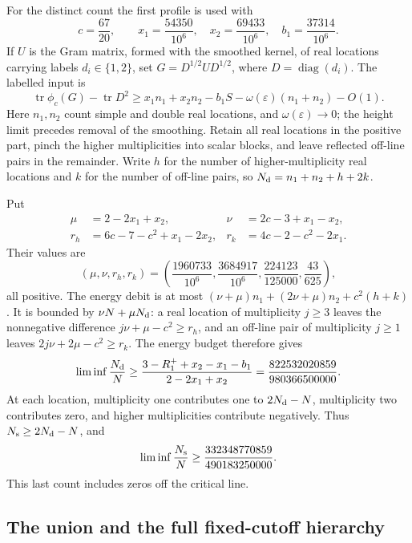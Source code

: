 \documentclass[11pt,reqno]{amsart}
\numberwithin{equation}{section}
\begin{document}
For the distinct count the first profile is used with
\[
 c=\frac{67}{20},\qquad
 x_1=\frac{54350}{10^6},\quad
 x_2=\frac{69433}{10^6},\quad b_1=\frac{37314}{10^6}.
\]
If $U$ is the Gram matrix, formed with the smoothed kernel, of real
locations carrying labels $d_i\in\{1,2\}$, set $G=D^{1/2}UD^{1/2}$, where
$D=\operatorname{diag}(d_i)$. The labelled input is
\[
 \operatorname{tr}\phi_c(G)-\operatorname{tr}D^2
 \ge x_1n_1+x_2n_2-b_1S-\omega(\varepsilon)(n_1+n_2)-O(1).
\]
Here $n_1,n_2$ count simple and double real locations, and
$\omega(\varepsilon)\to0$; the height limit precedes removal of the
smoothing. Retain all real locations in the positive part, pinch the
higher multiplicities into scalar blocks, and leave reflected off-line
pairs in the remainder.
Write $h$ for the number of higher-multiplicity real locations and
$k$ for the number of off-line pairs, so
$N_{\rm d}=n_1+n_2+h+2k$.

Put
\[
 \begin{aligned}
 \mu&=2-2x_1+x_2,&\nu&=2c-3+x_1-x_2,\\
 r_h&=6c-7-c^2+x_1-2x_2,&
 r_k&=4c-2-c^2-2x_1.
 \end{aligned}
\]
Their values are
\[
 (\mu,\nu,r_h,r_k)=
 \left(\frac{1960733}{10^6},\frac{3684917}{10^6},
       \frac{224123}{125000},\frac{43}{625}\right),
\]
all positive. The energy debit is at most
$(\nu+\mu)n_1+(2\nu+\mu)n_2+c^2(h+k)$.
It is bounded by $\nu N+\mu N_{\rm d}$: a real location of
multiplicity $j\ge3$ leaves the nonnegative difference
$j\nu+\mu-c^2\ge r_h$, and an off-line pair of multiplicity
$j\ge1$ leaves $2j\nu+2\mu-c^2\ge r_k$.
The energy budget therefore gives
\begin{equation}
 \liminf\frac{N_{\rm d}}N
 \ge\frac{3-R_1^++x_2-x_1-b_1}{2-2x_1+x_2}
 =\frac{822532020859}{980366500000}.
 \label{eq:plus-distinct}
\end{equation}
At each location, multiplicity one contributes one to
$2N_{\rm d}-N$, multiplicity two contributes zero, and higher
multiplicities contribute negatively. Thus
$N_{\rm s}\ge2N_{\rm d}-N$, and
\begin{equation}
 \liminf\frac{N_{\rm s}}N
 \ge\frac{332348770859}{490183250000}.
 \label{eq:plus-simple-anywhere}
\end{equation}
This last count includes zeros off the critical line.

\subsection{The union and the full fixed-cutoff hierarchy}
\end{document}
